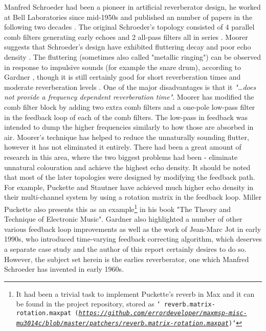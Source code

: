 \documentclass[12pt]{report}
\newcommand{\href}[2]{#2 (\texttt{\emph{\url{#1}}})} %
\begin{document}
  Manfred Schroeder had been a pioneer in artificial reverberator design, he
  worked at Bell Laboratories since mid-1950s and published an number of papers
  in the following two decades \cite{dattorro1997effect}. The original
  Schroeder's topology \cite{schroeder1962natural} consisted of 4 parallel comb
  filters generating early echoes and 2 all-pass filters all in series
  \cite{gardner1992virtual}.
  Moorer suggests that Schroeder's design have exhibited fluttering decay
  and poor echo density \cite{moorer1979about}. The fluttering (sometimes also
  called "metallic ringing") can be observed in response to impulsive sounds
  (for example the snare drum), according to Gardner \cite{gardner1992virtual},
  though it is still certainly good for short reverberation times and moderate
  reverberation levels \cite{gardner1998algorithms}. One of the major disadvantages
  is that it \emph{"\dots does not provide a frequency dependent reverberation time"}.
  Moorer \cite{moorer1979about} has modified the comb filter block by adding
  two extra comb filters and a one-pole low-pass filter in the feedback loop
  of each of the comb filters. The low-pass in feedback was intended to
  dump the higher frequencies similarly to how those are absorbed in air.
  Moorer's technique has helped to reduce the unnaturally sounding flutter,
  however it has not eliminated it entirely. There had been a great amount of
  research in this area, where the two biggest problems had been - eliminate
  unnatural colouration and achieve the highest echo density. It should be
  noted that most of the later topologies were designed by modifying the
  feedback path. For example, Puckette and Stautner \cite{puckette1982reverb}
  have achieved much higher echo density in their multi-channel system by
  using a rotation matrix in the feedback loop. Miller Puckette also presents
  this as an example\footnote{It had been a trivial task to implement Puckette's
  reverb in Max and it can be found in the project repository, stored as \texttt{`%
  \href{https://github.com/errordeveloper/maxmsp-misc-mu3014c/blob/master/patchers/reverb.matrix-rotation.maxpat}{reverb.matrix-rotation.maxpat}`}} in his book "The Theory and Technique of Electronic
  Music"\cite{puckette2007theory}.
  Gardner \cite{gardner1998algorithms} also highlighted a number of other
  various feedback loop improvements as well as the work of Jean-Marc Jot in
  early 1990s, who introduced time-varying feedback correcting algorithm,
  which deserves a separate case study and the author of this report certainly
  desires to do so. However, the subject set herein is the earlies reverberator,
  one which Manfred Schroeder has invented in early 1960s.
\end{document}
